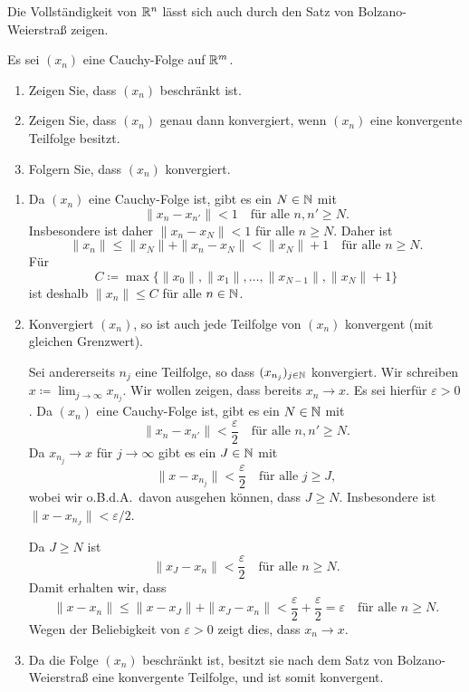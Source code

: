 \documentclass[a4paper,10pt]{article}
\begin{document}
Die Vollständigkeit von $\mathbb{R}^n$ lässt sich auch durch den Satz von Bolzano-Weierstraß zeigen.


\begin{question}
 Es sei $(x_n)$ eine Cauchy-Folge auf $\mathbb{R}^m$.
 \begin{enumerate}
  \item
   Zeigen Sie, dass $(x_n)$ beschränkt ist.
  \item
   Zeigen Sie, dass $(x_n)$ genau dann konvergiert, wenn $(x_n)$ eine konvergente Teilfolge besitzt.
  \item
   Folgern Sie, dass $(x_n)$ konvergiert.
 \end{enumerate}
\end{question}
\begin{solution}
 \begin{enumerate}
  \item
   Da $(x_n)$ eine Cauchy-Folge ist, gibt es ein $N \in \mathbb{N}$ mit
   \[
    \|x_n - x_{n'}\| < 1 \quad \text{für alle $n, n' \geq N$}.
   \]
   Insbesondere ist daher $\|x_n - x_N\| < 1$ für alle $n \geq N$. Daher ist
   \[
    \|x_n\|
    \leq \|x_N\| + \|x_n - x_N\|
    < \|x_N\| + 1
    \quad \text{für alle $n \geq N$}.
   \]
   Für
   \[
    C \coloneqq \max \{\|x_0\|, \|x_1\|, \dotsc, \|x_{N-1}\|, \|x_N\| + 1\}
   \]
   ist deshalb $\|x_n\| \leq C$ für alle $n \in \mathbb{N}$.
  \item
   Konvergiert $(x_n)$, so ist auch jede Teilfolge von $(x_n)$ konvergent (mit gleichen Grenzwert).
   
   Sei andererseits $n_j$ eine Teilfolge, so dass $(x_{n_j})_{j \in \mathbb{N}}$ konvergiert. Wir schreiben $x \coloneqq \lim_{j \to \infty} x_{n_j}$. Wir wollen zeigen, dass bereits $x_n \to x$. Es sei hierfür $\varepsilon > 0$. Da $(x_n)$ eine Cauchy-Folge ist, gibt es ein $N \in \mathbb{N}$ mit
   \begin{equation}
    \|x_n - x_{n'}\| < \frac{\varepsilon}{2} \quad \text{für alle $n, n' \geq N$}.
   \end{equation}
   Da $x_{n_j} \to x$ für $j \to \infty$ gibt es ein $J \in \mathbb{N}$ mit
   \[
    \|x - x_{n_j}\| < \frac{\varepsilon}{2} \quad \text{für alle $j \geq J$},
   \]
   wobei wir o.B.d.A.\ davon ausgehen können, dass $J \geq N$. Insbesondere ist $\|x - x_{n_J}\| < \varepsilon/2$.
   
   Da $J \geq N$ ist
   \[
    \|x_J - x_n\| < \frac{\varepsilon}{2} \quad \text{für alle $n \geq N$}.
   \]
   Damit erhalten wir, dass
   \[
    \|x - x_n\|
    \leq \|x - x_J\| + \|x_J - x_n\|
    < \frac{\varepsilon}{2} + \frac{\varepsilon}{2}
    = \varepsilon
    \quad \text{für alle $n \geq N$}.
   \]
   Wegen der Beliebigkeit von $\varepsilon > 0$ zeigt dies, dass $x_n \to x$.
  \item
   Da die Folge $(x_n)$ beschränkt ist, besitzt sie nach dem Satz von Bolzano-Weierstraß eine konvergente Teilfolge, und ist somit konvergent.
 \end{enumerate}
\end{solution}
\end{document}
